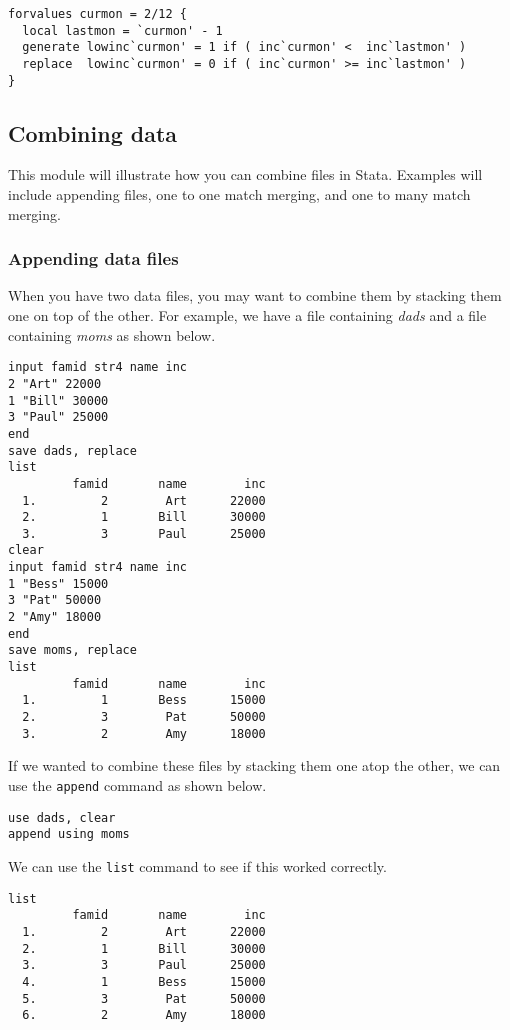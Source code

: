 \begin{lstlisting}
forvalues curmon = 2/12 {
  local lastmon = `curmon' - 1
  generate lowinc`curmon' = 1 if ( inc`curmon' <  inc`lastmon' )
  replace  lowinc`curmon' = 0 if ( inc`curmon' >= inc`lastmon' )
}
\end{lstlisting}

\subsection{Combining data}

This module will illustrate how you can combine files in Stata. Examples will include appending files, one to one match merging, and one to many match merging.

\subsubsection{Appending data files}
When you have two data files, you may want to combine them by stacking them one on top of the other. For example, we have a file containing \textit{dads} and a file containing \textit{moms} as shown below.

\begin{lstlisting}
input famid str4 name inc
2 "Art" 22000
1 "Bill" 30000
3 "Paul" 25000
end
save dads, replace
list
         famid       name        inc
  1.         2        Art      22000
  2.         1       Bill      30000
  3.         3       Paul      25000
clear
input famid str4 name inc
1 "Bess" 15000
3 "Pat" 50000
2 "Amy" 18000
end
save moms, replace
list
         famid       name        inc
  1.         1       Bess      15000
  2.         3        Pat      50000
  3.         2        Amy      18000
\end{lstlisting}

If we wanted to combine these files by stacking them one atop the other, we can use the \lstinline{append} command as shown below.

\begin{lstlisting}
use dads, clear
append using moms
\end{lstlisting}

We can use the \lstinline{list} command to see if this worked correctly.

\begin{lstlisting}
list
         famid       name        inc
  1.         2        Art      22000
  2.         1       Bill      30000
  3.         3       Paul      25000
  4.         1       Bess      15000
  5.         3        Pat      50000
  6.         2        Amy      18000
\end{lstlisting}

